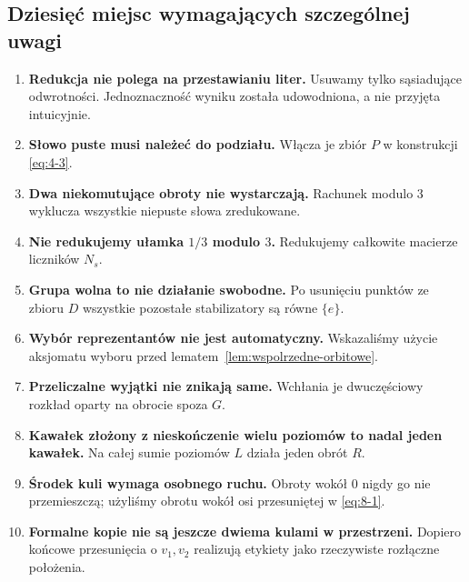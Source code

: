 \subsection{Dziesięć miejsc wymagających szczególnej uwagi}
\begin{enumerate}
\item \textbf{Redukcja nie polega na przestawianiu liter.} Usuwamy tylko sąsiadujące odwrotności. Jednoznaczność wyniku została udowodniona, a nie przyjęta intuicyjnie.
\item \textbf{Słowo puste musi należeć do podziału.} Włącza je zbiór $P$ w konstrukcji \eqref{eq:4-3}.
\item \textbf{Dwa niekomutujące obroty nie wystarczają.} Rachunek modulo $3$ wyklucza wszystkie niepuste słowa zredukowane.
\item \textbf{Nie redukujemy ułamka $1/3$ modulo $3$.} Redukujemy całkowite macierze liczników $N_s$.
\item \textbf{Grupa wolna to nie działanie swobodne.} Po usunięciu punktów ze zbioru $D$ wszystkie pozostałe stabilizatory są równe $\{e\}$.
\item \textbf{Wybór reprezentantów nie jest automatyczny.} Wskazaliśmy użycie aksjomatu wyboru przed lematem~\ref{lem:wspolrzedne-orbitowe}.
\item \textbf{Przeliczalne wyjątki nie znikają same.} Wchłania je dwuczęściowy rozkład oparty na obrocie spoza $G$.
\item \textbf{Kawałek złożony z nieskończenie wielu poziomów to nadal jeden kawałek.} Na całej sumie poziomów $L$ działa jeden obrót $R$.
\item \textbf{Środek kuli wymaga osobnego ruchu.} Obroty wokół $0$ nigdy go nie przemieszczą; użyliśmy obrotu wokół osi przesuniętej w \eqref{eq:8-1}.
\item \textbf{Formalne kopie nie są jeszcze dwiema kulami w przestrzeni.} Dopiero końcowe przesunięcia o $v_1,v_2$ realizują etykiety jako rzeczywiste rozłączne położenia.
\end{enumerate}
